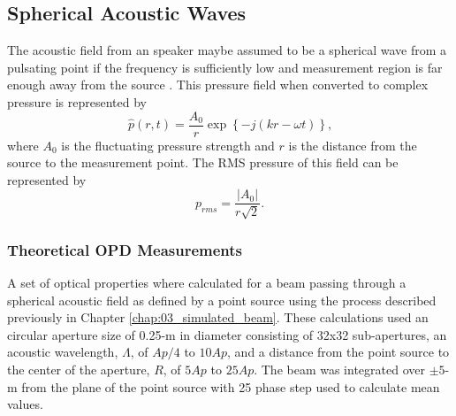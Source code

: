 \subsection{Spherical Acoustic Waves}
The acoustic field from an speaker maybe assumed to be a spherical wave from a pulsating point if the frequency is sufficiently low and measurement region is far enough away from the source \cite{Randall-1951-9NtPPXPq}.
This pressure field when converted to complex pressure is represented by
\begin{equation}
  \hat{p}(r,t) = \frac{A_0}{r}\exp\left\{-j(kr-\omega t)\right\} \textrm{,}
  \label{eqn:03_spherical_pressure}
\end{equation}
where $A_0$ is the fluctuating pressure strength and $r$ is the distance from the source to the measurement point.
The RMS pressure of this field can be represented by
\begin{equation}
  p_{rms} = \frac{|A_0|}{r\sqrt{2}} \textrm{.}
  \label{eqn:03_spherical_pressure_rms}
\end{equation}

\subsubsection{Theoretical OPD Measurements}
A set of optical properties where calculated for a beam passing through a spherical acoustic field as defined by a point source using the process described previously in Chapter \ref{chap:03_simulated_beam}.
These calculations used an circular aperture size of 0.25-m in diameter consisting of 32x32 sub-apertures, an acoustic wavelength, $\Lambda$, of $Ap/4$ to $10Ap$, and a distance from the point source to the center of the aperture, $R$, of $5Ap$ to $25Ap$.
The beam was integrated over $\pm5$-m from the plane of the point source with 25 phase step used to calculate mean values.

